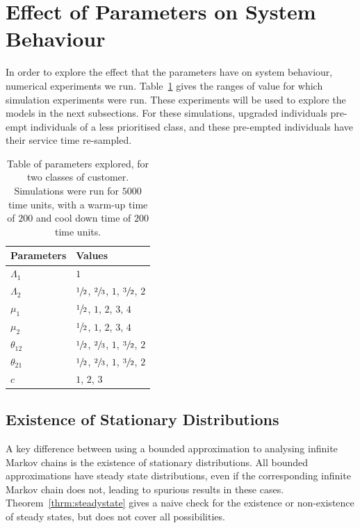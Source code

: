 \documentclass{article}
\begin{document}
\section{Effect of Parameters on System Behaviour}\label{sec:behaviour}
In order to explore the effect that the parameters have on system behaviour,
numerical experiments we run. Table~\ref{tbl:parameter_sweep} gives the ranges
of value for which simulation experiments were run. These experiments will be
used to explore the models in the next subsections. For these simulations,
upgraded individuals pre-empt individuals of a less prioritised class, and these
pre-empted individuals have their service time re-sampled.

\begin{table}
\begin{center}
\begin{tabular}{ll}
\toprule
Parameters & Values \\
\midrule
$\Lambda_1$ & $1$ \\
$\Lambda_2$ & $\sfrac{1}{2}$, $\sfrac{2}{3}$, $1$, $\sfrac{3}{2}$, $2$ \\
$\mu_1$ & $\sfrac{1}{2}$, $1$, $2$, $3$, $4$ \\
$\mu_2$ & $\sfrac{1}{2}$, $1$, $2$, $3$, $4$ \\
$\theta_{12}$ & $\sfrac{1}{2}$, $\sfrac{2}{3}$, $1$, $\sfrac{3}{2}$, $2$ \\
$\theta_{21}$ & $\sfrac{1}{2}$, $\sfrac{2}{3}$, $1$, $\sfrac{3}{2}$, $2$ \\
$c$ & $1$, $2$, $3$ \\
\bottomrule
\end{tabular}
\caption{Table of parameters explored, for two classes of customer. Simulations
         were run for $5000$ time units, with a warm-up time of $200$ and cool
         down time of $200$ time units.}
\label{tbl:parameter_sweep}
\end{center}
\end{table}



\subsection{Existence of Stationary Distributions}\label{sec:stationary}
A key difference between using a bounded approximation to analysing infinite
Markov chains is the existence of stationary distributions. All bounded
approximations have steady state distributions, even if the corresponding
infinite Markov chain does not, leading to spurious results in these cases.
Theorem~\ref{thrm:steadystate} gives a naive check for the existence or
non-existence of steady states, but does not cover all possibilities.
\end{document}
